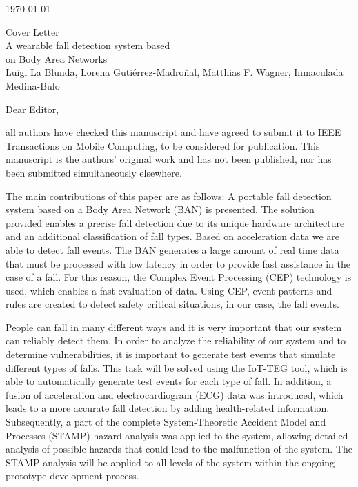 \documentclass[parskip]{scrartcl}
\begin{document}
 
\pagestyle{empty}

\begin{flushright}
    \Large
    \today
\end{flushright}

\begin{center}
    \huge
    Cover Letter\\
    \vspace{0.4cm}
    \LARGE
    A wearable fall detection system based \\ on Body
    Area Networks\\
    \vspace{0.4cm}
    \large
    Luigi La Blunda, Lorena Gutiérrez-Madroñal, Matthias F. Wagner, Inmaculada Medina-Bulo
\end{center}
 
    \vspace{0.8cm}

    \normalsize
Dear Editor,

all authors have checked this manuscript and have agreed to submit it to IEEE Transactions on Mobile Computing, to be considered for publication. This manuscript is the authors' original work and has not been published, nor has been submitted simultaneously elsewhere.

The main contributions of this paper are as follows:
A portable fall detection system based on a Body Area Network (BAN) is presented. The solution provided enables a precise fall detection due to its unique hardware architecture and an additional classification of fall types.
Based on acceleration data we are able to detect fall events.
The BAN generates a large amount of real time data that must be processed with low latency in order to provide fast assistance in the case of a fall. For this reason, the Complex Event Processing (CEP) technology is used, which enables a fast evaluation of data. Using CEP, event patterns and rules are created to detect safety critical situations, in our case, the fall events.

People can fall in many different ways and it is very important that our system can reliably detect them. In order to analyze the reliability of our system and to determine vulnerabilities, it is important to generate test events that simulate different types of falls. This task will be solved using the IoT-TEG tool, which is able to automatically generate test events for each type of fall. In addition, a fusion of acceleration and electrocardiogram (ECG) data was introduced, which leads to a more accurate fall detection by adding health-related information. Subsequently, a part of the complete System-Theoretic Accident Model and Processes (STAMP) hazard analysis was applied to the system, allowing detailed analysis of possible hazards that could lead to the malfunction of the system. The STAMP analysis will be applied to all levels of the system within the ongoing prototype development process. \newpage
\end{document}
